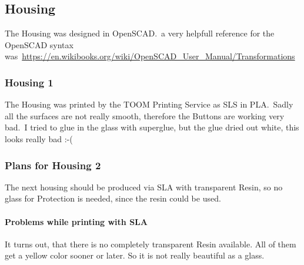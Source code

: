\subsection{Housing}
The Housing was designed in OpenSCAD.\
a very helpfull reference for the OpenSCAD syntax was\
\url{https://en.wikibooks.org/wiki/OpenSCAD_User_Manual/Transformations}

\subsubsection{Housing 1}
The Housing was printed by the TOOM Printing Service as SLS in PLA.\
Sadly all the surfaces are not really smooth, therefore the Buttons are working very bad.\
I tried to glue in the glass with superglue, but the glue dried out white, this looks really bad :-(\

\subsubsection{Plans for Housing 2}
The next housing should be produced via SLA with transparent Resin, so no glass for Protection is needed, 
since the resin could be used.
\paragraph{Problems while printing with SLA}
It turns out, that there is no completely transparent Resin available. All of them get a yellow color sooner or later.
So it is not really beautiful as a glass.

